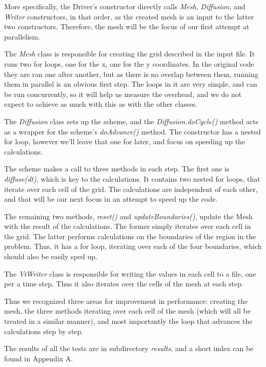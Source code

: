 \documentclass[11pt,journal]{IEEEtran}
\begin{document}
	More specifically, the Driver's constructor directly calls \emph{Mesh}, \emph{Diffusion}, and \emph{Writer} constructors, in that order, as the created mesh is an input to the latter two constructors. Therefore, the mesh will be the focus of our first attempt at parallelism. 
	
	The \emph{Mesh} class is responsible for creating the grid described in the input file. It runs two for loops, one for the x, one for the y coordinates. In the original code they are ran one after another, but as there is no overlap between them, running them in parallel is an obvious first step. The loops in it are very simple, and can be run concurrently, so it will help us measure the overhead, and we do not expect to achieve as much with this as with the other classes.
	
	The \emph{Diffusion} class sets up the scheme, and the \emph{Diffusion.doCycle()} method acts as a wrapper for the scheme's \emph{doAdvance()} method. The constructor has a nested for loop, however we'll leave that one for later, and focus on speeding up the calculations.
	
	The scheme makes a call to three methods in each step. The first one is \emph{diffuse(dt)}, which is key to the calculations. It contains two nested for loops, that iterate over each cell of the grid. The calculations are independent of each other, and that will be our next focus in an attempt to speed up the code.
	
	The remaining two methods, \emph{reset()} and \emph{updateBoundaries()}, update the Mesh with the result of the calculations. The former simply iterates over each cell in the grid. The latter performs calculations on the boundaries of the region in the problem. Thus, it has a for loop, iterating over each of the four boundaries, which should also be easily sped up.
	
	The \emph{VtWriter} class is responsible for writing the values in each cell to a file, one per a time step. Thus it also iterates over the cells of the mesh at each step.
	
	Thus we recognized three areas for improvement in performance: creating the mesh, the three methods iterating over each cell of the mesh (which will all be treated in a similar manner), and most importantly the loop that advances the calculations step by step. 
	
	The results of all the tests are in subdirectory \emph{results}, and a short index can be found in Appendix A.
	
\end{document}
